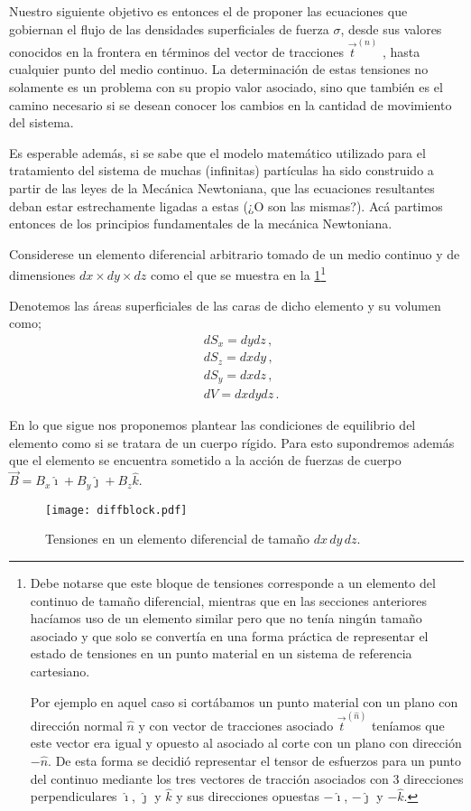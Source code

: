 \documentclass[../notas medios.tex]{subfiles}
\begin{document}
Nuestro siguiente objetivo es entonces el de proponer las ecuaciones que gobiernan el flujo de las densidades superficiales de fuerza $\sigma$, desde sus valores conocidos en la frontera en términos del vector de tracciones ${\vec t^{(n)}}$ , hasta cualquier punto del medio continuo.  La determinación de estas tensiones no solamente es un problema con su propio valor asociado, sino que también es el camino necesario si se desean conocer los cambios en la cantidad de movimiento del sistema.

Es esperable además, si se sabe que el modelo matemático utilizado para el tratamiento del sistema de muchas (infinitas) partículas ha sido construido a partir de las leyes de la Mecánica Newtoniana, que las ecuaciones resultantes deban estar estrechamente ligadas a estas (¿O son las mismas?).  Acá partimos entonces de los principios fundamentales de la mecánica Newtoniana.

Considerese un elemento diferencial arbitrario tomado de un medio continuo y de dimensiones $dx \times dy \times dz$ como el que se muestra en la \cref{diff}\footnote{Debe notarse que este bloque de tensiones corresponde a un elemento del continuo de tamaño diferencial, mientras que en las secciones anteriores hacíamos uso de un elemento similar pero que no tenía ningún tamaño asociado y que solo se convertía en una forma práctica de representar el estado de tensiones en un punto material en un sistema de referencia cartesiano.

Por ejemplo en aquel caso si cortábamos un punto material con un plano con dirección normal $\hat{n}$ y con vector de tracciones asociado $\vec t^{(\hat n)}$ teníamos que este vector era igual y opuesto al asociado al corte con un plano con dirección $-\hat{n}$. De esta forma se decidió representar el tensor de esfuerzos para un punto del continuo mediante los tres vectores de tracción asociados con  3 direcciones perpendiculares $\hat{\imath}$, $\hat{\jmath}$ y $\hat{k}$ y sus direcciones opuestas $-\hat{\imath}$, $-\hat{\jmath}$ y $-\hat{k}$.}

Denotemos las áreas superficiales de las caras de dicho elemento y su volumen como;
\begin{align*}
&d{S_x} = dydz\, ,\\
&d{S_z} = dxdy\, ,\\
&d{S_y} = dxdz\, ,\\
&dV = dxdydz\, .
\end{align*}

En lo que sigue nos proponemos plantear las condiciones de equilibrio del elemento como si se tratara de un cuerpo rígido. Para esto supondremos además que el elemento se encuentra sometido a la acción de fuerzas de cuerpo $\vec B = B_x \hat\imath + B_y \hat\jmath + {B_z}\hat k$.
\begin{figure}[h]
\centering
	\texttt{[image: diffblock.pdf]}
	\caption{Tensiones en un elemento diferencial de tamaño $dx\, dy\, dz$.}
	\label{diff}
\end{figure}
\end{document}
